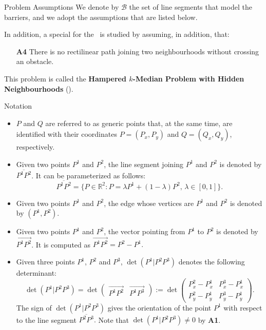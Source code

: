 \documentclass[slidestop,usepdftitle=false,10pt]{beamer}
\newcommand{\KMPHN}{{\sf{H-KMPHN}}}
\newcommand{\KMPN}{{\sf{H-KMPN}\xspace }}
\newcommand{\segment}[2]{\overline{#1#2}}
\newcommand{\determinant}[3]{\det({#1|#2#3})}
\begin{document}
	\begin{frame}{Problem Assumptions}
		\footnotesize
		We denote by $\mathcal{B}$ the set of line segments that model the barriers, and we adopt the assumptions that are listed below.

		\bigskip

		In addition, a special for the \KMPN \ is studied by assuming, in addition, that:
		\begin{enumerate}
			\setcounter{enumi}{3}
			\item[\textbf{A4}] \label{A4}There is no rectilinear path joining two neighbourhoods without crossing an obstacle.
		\end{enumerate} 
		This problem is called the \textbf{Hampered $k$-Median Problem with Hidden Neighbourhoods} (\KMPHN).
		
	\end{frame}
	
	\begin{frame}{Notation}
		\footnotesize
		\begin{itemize}
			\item $P$ and $Q$ are referred to as generic points that, at the same time, are identified with their coordinates $P=(P_x, P_y)$ and $Q=(Q_x, Q_y)$, respectively.
			\item Given two points $P^1$ and $P^2$, the line segment joining $P^1$ and $P^2$ is denoted by $\segment{P^1}{P^2}$. It can be parameterized as follows:
			$$\segment{P^1}{P^2}=\{P\in\mathbb R^2:P=\lambda P^1 + (1-\lambda)P^2,\,\lambda\in[0,1]\}.$$
			\item  Given two points $P^1$ and $P^2$, the edge whose vertices are $P^1$ and $P^2$ is denoted by $(P^1, P^2)$.
			\item  Given two points $P^1$ and $P^2$, the vector pointing from $P^1$ to $P^2$ is denoted by $\overrightarrow{P^1P^2}$. It is computed as
			$\overrightarrow{P^1P^2}=P^2-P^1.$
			\item Given three points $P^1$, $P^2$ and $P^3$, $\determinant{P^1}{P^2}{P^3}$ denotes the following determinant:
			$$
			\determinant{P^1}{P^2}{P^3}=\det\left(\begin{array}{c|c} \overrightarrow{P^1P^2} & \overrightarrow{P^1P^3}\end{array}\right):=\det\left( \begin{array}{cc}  P^2_x-P^1_x & P^3_x-P^1_x \\ P_y^2-P^1_y & P_y^3-P_y^1 \end{array}\right).
			$$
			The sign of $\determinant{P^1}{P^2}{P^3}$ gives the orientation of the point $P^1$ with respect to the line segment $\segment{P^2}{P^3}.$ Note that $\determinant{P^1}{P^2}{P^3}\neq 0$ by \textbf{A1}. 
		\end{itemize}
	\end{frame}
\end{document}
